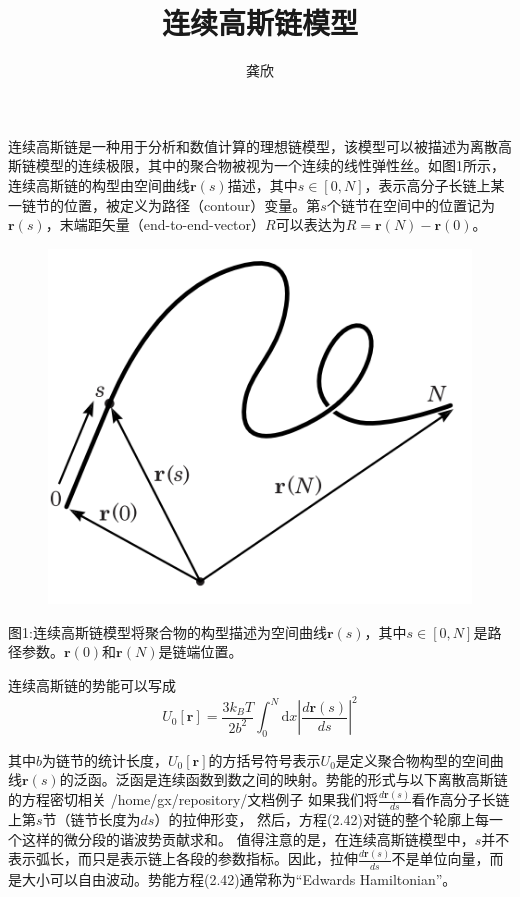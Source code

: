 \documentclass[12pt,a4paper]{article}
\title{连续高斯链模型}
\author{龚欣}
\date{\chntoday}
\begin{document}
\maketitle

连续高斯链是一种用于分析和数值计算的理想链模型，该模型可以被描述为离散高斯链模型的连续极限，其中的聚合物被视为一个连续的线性弹性丝。如图1所示，连续高斯链的构型由空间曲线$\mathbf{r}(s)$描述，其中$s\in [0,N]$，表示高分子长链上某一链节的位置，被定义为路径（contour）变量。第$s$个链节在空间中的位置记为$\mathbf{r}(s)$，末端距矢量（end-to-end-vector）$R$可以表达为$R=\mathbf{r}(N)−\mathbf{r}(0)$。

\begin{figure}[H]
\centering
\includegraphics[scale=0.7]{./figures/1.png}
\caption{}
\end{figure}


图1:连续高斯链模型将聚合物的构型描述为空间曲线$\mathbf{r}(s)$，其中$s\in [0,N]$是路径参数。$\mathbf{r}(0)$和$\mathbf{r}(N)$是链端位置。

连续高斯链的势能可以写成
$$U_0[\mathbf{r}]=\frac{3k_BT}{2b^2}\int_{0}^{N} \mathrm{d}x\left| \frac{d\mathbf{r}(s)}{ds} \right|^2$$

其中$b$为链节的统计长度，$U_0[\mathbf{r}]$的方括号符号表示$U_0$是定义聚合物构型的空间曲线$\mathbf{r}(s)$的泛函。泛函是连续函数到数之间的映射。势能的形式与以下离散高斯链的方程密切相关
/home/gx/repository/文档例子
如果我们将$\frac{d\mathbf{r}(s)}{ds}$看作高分子长链上第$s$节（链节长度为$ds$）的拉伸形变，
然后，方程(2.42)对链的整个轮廓上每一个这样的微分段的谐波势贡献求和。
值得注意的是，在连续高斯链模型中，$s$并不表示弧长，而只是表示链上各段的参数指标。因此，拉伸$\frac{d\mathbf{r}(s)}{ds}$不是单位向量，而是大小可以自由波动。势能方程(2.42)通常称为“Edwards Hamiltonian”。
\end{document}
